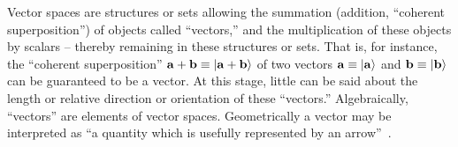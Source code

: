 Vector spaces are structures or sets  allowing the
summation (addition,  ``coherent superposition'') of objects called ``vectors,'' and the multiplication
of these objects by scalars --  thereby remaining in these structures or sets.
That is, for instance, the ``coherent superposition''  ${\bf a} + {\bf b}\equiv \vert {\bf a} + {\bf b} \rangle $
of two vectors ${\bf a} \equiv \vert {\bf a} \rangle $ and ${\bf b} \equiv \vert {\bf b} \rangle $ can be guaranteed to
be a vector.
At this stage, little can be said about the length or relative direction or orientation of these ``vectors.''
Algebraically, ``vectors'' are elements of vector spaces.
Geometrically a vector may be interpreted as ``a quantity which is usefully represented by an arrow''~\cite{Weinreich}.



